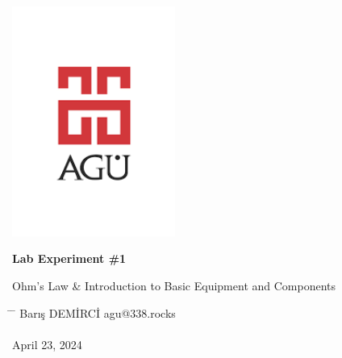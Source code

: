 \begin{center}
	\includegraphics[width=0.4\textwidth]{assets/agu.png}

	\Huge
	\textbf{Lab Experiment \#1}

	\vspace{0.3cm}
	\Huge
	Ohm's Law \& Introduction to Basic Equipment and Components

	\vspace{0.8cm}
	\large
	\vspace{0.5cm}
	\LARGE
	\vspace{1.5cm}
	\textbf{}
	\vfill
	\vspace{0.8cm}
	\Large
\end{center}

\begin{tabbing}
	\hspace*{1em}\= \hspace*{8em} \= \kill
	\> Barış DEMİRCİ \> agu@338.rocks \\
	\> \> \\
	\> April 23, 2024 \> \\
\end{tabbing}
